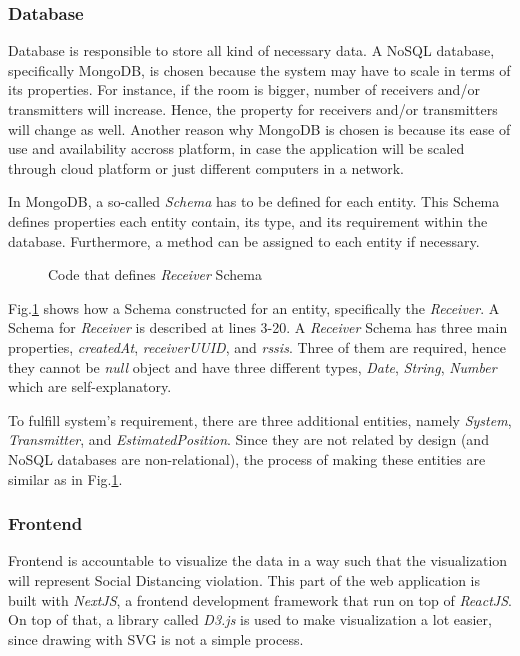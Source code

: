 \documentclass[conference]{IEEEtran}
\begin{document}
\subsubsection{Database}
Database is responsible to store all kind of necessary data. A NoSQL database,
specifically MongoDB, is chosen because the system may have to scale in 
terms of its properties. For instance, if the room is bigger, number of 
receivers and/or transmitters will increase. Hence, the property for 
receivers and/or transmitters will change as well. Another reason 
why MongoDB is chosen is because its ease of use and availability accross
platform, in case the application will be scaled through cloud platform 
or just different computers in a network.

In MongoDB, a so-called \emph{Schema} has to be defined for each entity.
This Schema defines properties each entity contain, its type, and its 
requirement within the database. Furthermore, a method can be assigned 
to each entity if necessary. 

\begin{figure}[htbp]
    
    \caption{Code that defines \emph{Receiver} Schema}
    \label{fig:receiver_schema_sc}
\end{figure}

Fig.\ref{fig:receiver_schema_sc} shows how a Schema constructed for an entity,
specifically the \emph{Receiver}. A Schema for \emph{Receiver} is described
at lines 3-20. A \emph{Receiver} Schema has three main 
properties, \emph{createdAt}, \emph{receiverUUID}, and \emph{rssis}.
Three of them are required, hence they cannot be \emph{null} object and
have three different types, \emph{Date}, \emph{String}, \emph{Number} which 
are self-explanatory.

To fulfill system's requirement, there are three additional entities,
namely \emph{System}, \emph{Transmitter}, and \emph{EstimatedPosition}.
Since they are not related by design (and NoSQL databases are non-relational),
the process of making these entities are similar as in Fig.\ref{fig:receiver_schema_sc}.

\subsubsection{Frontend}

Frontend is accountable to visualize the data in a way such that the visualization
will represent Social Distancing violation. This part of the web application
is built with \emph{NextJS}, a frontend development framework that run on top of 
\emph{ReactJS}. On top of that, a library called \emph{D3.js} is used
to make visualization a lot easier, since drawing with SVG is not a simple
process.
\end{document}
